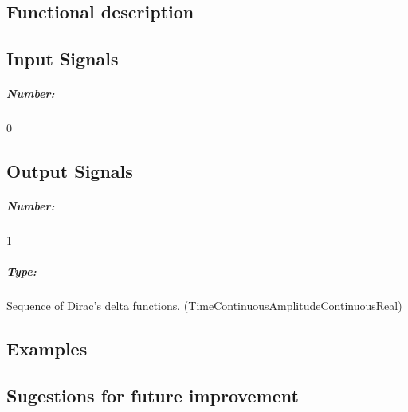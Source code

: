 \subsection*{Functional description}


\pagebreak

\subsection*{Input Signals}

\subparagraph*{Number:} 0

\subsection*{Output Signals}

\subparagraph*{Number:} 1

\subparagraph*{Type:} Sequence of Dirac's delta functions. (TimeContinuousAmplitudeContinuousReal)

\subsection*{Examples}


\subsection*{Sugestions for future improvement}

